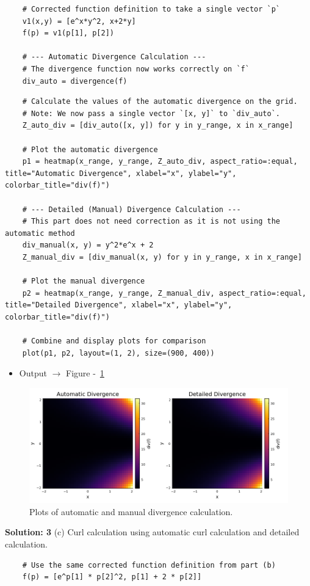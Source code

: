 \documentclass{homework}
\begin{document}
\begin{solution}
\begin{verbatim}
    # Corrected function definition to take a single vector `p`
    v1(x,y) = [e^x*y^2, x+2*y]
    f(p) = v1(p[1], p[2])
    
    # --- Automatic Divergence Calculation ---
    # The divergence function now works correctly on `f`
    div_auto = divergence(f)  
    \end{verbatim}
    \begin{verbatim}
    # Calculate the values of the automatic divergence on the grid.
    # Note: We now pass a single vector `[x, y]` to `div_auto`.
    Z_auto_div = [div_auto([x, y]) for y in y_range, x in x_range]
    
    # Plot the automatic divergence
    p1 = heatmap(x_range, y_range, Z_auto_div, aspect_ratio=:equal, title="Automatic Divergence", xlabel="x", ylabel="y", colorbar_title="div(f)")

    # --- Detailed (Manual) Divergence Calculation ---
    # This part does not need correction as it is not using the automatic method
    div_manual(x, y) = y^2*e^x + 2
    Z_manual_div = [div_manual(x, y) for y in y_range, x in x_range]
    
    # Plot the manual divergence
    p2 = heatmap(x_range, y_range, Z_manual_div, aspect_ratio=:equal, title="Detailed Divergence", xlabel="x", ylabel="y", colorbar_title="div(f)")

    # Combine and display plots for comparison
    plot(p1, p2, layout=(1, 2), size=(900, 400))
    \end{verbatim}
    
    \begin{itemize}
        \item Output $\rightarrow$ Figure -~\ref{fig:divegencecalvsauto-2}
    \end{itemize}
    
    \begin{figure}[H]
        \centering
        \includegraphics[width=0.5\linewidth]{media/divegencecalvsauto-2.png}
        \caption{Plots of  automatic and manual divergence calculation.}
        \label{fig:divegencecalvsauto-2}
    \end{figure}
    
    \textbf{Solution: 3}
    (c)  Curl calculation using automatic curl calculation and detailed calculation.
    \begin{verbatim}
    # Use the same corrected function definition from part (b)
    f(p) = [e^p[1] * p[2]^2, p[1] + 2 * p[2]]
    

\end{verbatim}
\end{solution}
\end{document}
